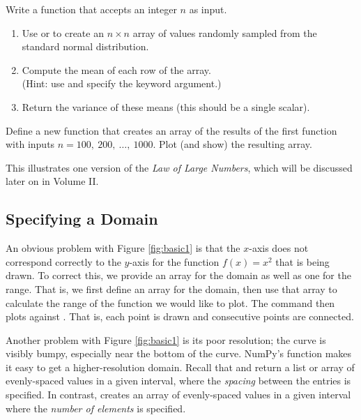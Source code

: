 \begin{problem} %
Write a function that accepts an integer $n$ as input.
\begin{enumerate}
\item Use  or  to create an $n\times n$ array of values randomly sampled from the standard normal distribution.
\item Compute the mean of each row of the array.
\\(Hint: use  and specify the  keyword argument.)
\item Return the variance of these means (this should be a single scalar).
\end{enumerate}
Define a new function that creates an array of the results of the first function with inputs $n = 100,\ 200,\ \ldots,\ 1000$.
%
Plot (and show) the resulting array.

This illustrates one version of the \emph{Law of Large Numbers}, which will be discussed later on in Volume II.
\end{problem}

\subsection*{Specifying a Domain} %

An obvious problem with Figure \ref{fig:basic1} is that the $x$-axis does not correspond correctly to the $y$-axis for the function $f(x) = x^2$ that is being drawn.
To correct this, we provide an array for the domain as well as one for the range.
That is, we first define an array  for the domain, then use that array to calculate the range  of the function we would like to plot.
The command  then plots  against .
That is, each point  is drawn and consecutive points are connected.

Another problem with Figure \ref{fig:basic1} is its poor resolution; the curve is visibly bumpy, especially near the bottom of the curve.
NumPy's  function makes it easy to get a higher-resolution domain.
Recall that  and  return a list or array of evenly-spaced values in a given interval, where the \emph{spacing} between the entries is specified.
In contrast,  creates an array of evenly-spaced values in a given interval where the \emph{number of elements} is specified.

